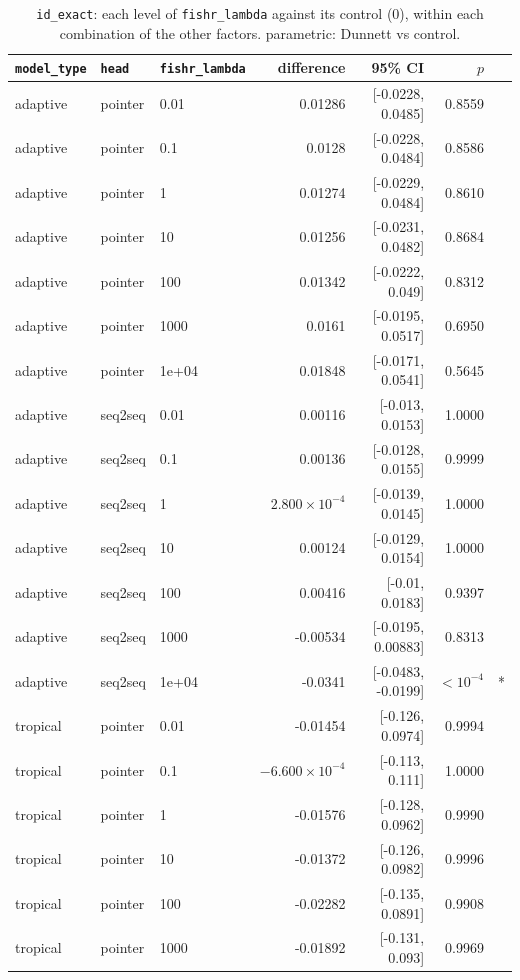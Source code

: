 \documentclass[10pt]{article}
\begin{document}
{\small
\begin{longtable}{lllrrrl}
\caption{\texttt{id\_exact}: each level of \texttt{fishr\_lambda} against its control (0), within each combination of the other factors. parametric: Dunnett vs control.}\label{tab:control-id_exact}\\
\toprule
\texttt{model\_type} & \texttt{head} & \texttt{fishr\_lambda} & difference & 95\% CI & $p$ & \\
\midrule
\endhead
adaptive & pointer & 0.01 & 0.01286 & [-0.0228, 0.0485] & 0.8559 & \\
adaptive & pointer & 0.1 & 0.0128 & [-0.0228, 0.0484] & 0.8586 & \\
adaptive & pointer & 1 & 0.01274 & [-0.0229, 0.0484] & 0.8610 & \\
adaptive & pointer & 10 & 0.01256 & [-0.0231, 0.0482] & 0.8684 & \\
adaptive & pointer & 100 & 0.01342 & [-0.0222, 0.049] & 0.8312 & \\
adaptive & pointer & 1000 & 0.0161 & [-0.0195, 0.0517] & 0.6950 & \\
adaptive & pointer & 1e+04 & 0.01848 & [-0.0171, 0.0541] & 0.5645 & \\
adaptive & seq2seq & 0.01 & 0.00116 & [-0.013, 0.0153] & 1.0000 & \\
adaptive & seq2seq & 0.1 & 0.00136 & [-0.0128, 0.0155] & 0.9999 & \\
adaptive & seq2seq & 1 & $2.800\times10^{-4}$ & [-0.0139, 0.0145] & 1.0000 & \\
adaptive & seq2seq & 10 & 0.00124 & [-0.0129, 0.0154] & 1.0000 & \\
adaptive & seq2seq & 100 & 0.00416 & [-0.01, 0.0183] & 0.9397 & \\
adaptive & seq2seq & 1000 & -0.00534 & [-0.0195, 0.00883] & 0.8313 & \\
adaptive & seq2seq & 1e+04 & -0.0341 & [-0.0483, -0.0199] & $<10^{-4}$ & *\\
tropical & pointer & 0.01 & -0.01454 & [-0.126, 0.0974] & 0.9994 & \\
tropical & pointer & 0.1 & $-6.600\times10^{-4}$ & [-0.113, 0.111] & 1.0000 & \\
tropical & pointer & 1 & -0.01576 & [-0.128, 0.0962] & 0.9990 & \\
tropical & pointer & 10 & -0.01372 & [-0.126, 0.0982] & 0.9996 & \\
tropical & pointer & 100 & -0.02282 & [-0.135, 0.0891] & 0.9908 & \\
tropical & pointer & 1000 & -0.01892 & [-0.131, 0.093] & 0.9969 & \\

\end{longtable}}
\end{document}

